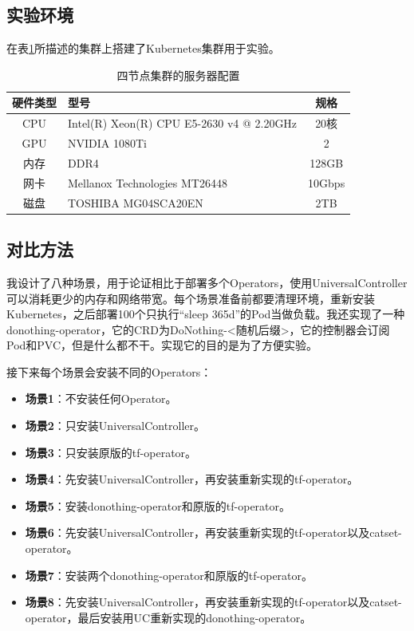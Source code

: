 \documentclass[macfonts,master]{njuthesis}
\begin{document}
\subsection{实验环境}

在表\ref{table:test-env}所描述的集群上搭建了Kubernetes集群用于实验。
\begin{table}
  \centering
  \begin{tabular}{cp{60mm}c}
    \toprule
    \textbf{硬件类型} & \textbf{型号} & \textbf{规格} \\
    \midrule
    CPU  & Intel(R) Xeon(R) CPU E5-2630 v4 @ 2.20GHz  & 20核\\
    GPU  & NVIDIA 1080Ti   &  2 \\
    内存     & DDR4 & 128GB \\
    网卡    & Mellanox Technologies MT26448   & 10Gbps \\
    磁盘 & TOSHIBA MG04SCA20EN & 2TB \\
    \bottomrule
  \end{tabular}
  \caption{四节点集群的服务器配置}\label{table:test-env}
\end{table}

\subsection{对比方法}

我设计了八种场景，用于论证相比于部署多个Operators，使用UniversalController可以消耗更少的内存和网络带宽。每个场景准备前都要清理环境，重新安装Kubernetes，之后部署100个只执行``sleep 365d''的Pod当做负载。我还实现了一种donothing-operator，它的CRD为DoNothing-<随机后缀>，它的控制器会订阅Pod和PVC，但是什么都不干。实现它的目的是为了方便实验。

接下来每个场景会安装不同的Operators：
\begin{itemize}
	\item \textbf{场景1}：不安装任何Operator。
	\item \textbf{场景2}：只安装UniversalController。
	\item \textbf{场景3}：只安装原版的tf-operator。
	\item \textbf{场景4}：先安装UniversalController，再安装重新实现的tf-operator。
	\item \textbf{场景5}：安装donothing-operator和原版的tf-operator。
	\item \textbf{场景6}：先安装UniversalController，再安装重新实现的tf-operator以及catset-operator。
	\item \textbf{场景7}：安装两个donothing-operator和原版的tf-operator。
	\item \textbf{场景8}：先安装UniversalController，再安装重新实现的tf-operator以及catset-operator，最后安装用UC重新实现的donothing-operator。
\end{itemize}
\end{document}

